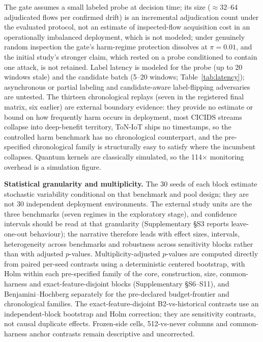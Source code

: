 \documentclass[a4paper,fleqn]{cas-sc}
\begin{document}
The gate assumes a small labeled probe at decision time; its size ($\approx$32--64 adjudicated flows per confirmed drift) is an incremental adjudication count under the evaluated protocol, not an estimate of inspected-flow acquisition cost in an operationally imbalanced deployment, which is not modeled; under genuinely random inspection the gate's harm-regime protection dissolves at $\pi = 0.01$, and the initial study's stronger claim, which rested on a probe conditioned to contain one attack, is not retained. Label latency is modeled for the probe (up to 20 windows stale) and the candidate batch (5--20 windows; Table~\ref{tab:latency}); asynchronous or partial labeling and candidate-aware label-flipping adversaries are untested. The thirteen chronological replays (seven in the registered final matrix, six earlier) are external boundary evidence: they provide no estimate or bound on how frequently harm occurs in deployment, most CICIDS streams collapse into deep-benefit territory, ToN-IoT ships no timestamps, so the controlled harm benchmark has no chronological counterpart, and the pre-specified chronological family is structurally easy to satisfy where the incumbent collapses. Quantum kernels are classically simulated, so the 114$\times$ monitoring overhead is a simulation figure.

\textbf{Statistical granularity and multiplicity.} The 30 seeds of each block estimate stochastic variability conditional on that benchmark and pool design; they are not 30 independent deployment environments. The external study units are the three benchmarks (seven regimes in the exploratory stage), and confidence intervals should be read at that granularity (Supplementary \S S3 reports leave-one-out behaviour); the narrative therefore leads with effect sizes, intervals, heterogeneity across benchmarks and robustness across sensitivity blocks rather than with adjusted $p$-values. Multiplicity-adjusted $p$-values are computed directly from paired per-seed contrasts using a deterministic centered bootstrap, with Holm \cite{holm1979simple} within each pre-specified family of the core, construction, size, common-harness and exact-feature-disjoint blocks (Supplementary \S S6--S11), and Benjamini--Hochberg \cite{benjamini1995controlling} separately for the pre-declared budget-frontier and chronological families. The exact-feature-disjoint B2-vs-historical contrasts use an independent-block bootstrap and Holm correction; they are sensitivity contrasts, not causal duplicate effects. Frozen-side cells, 512-vs-never columns and common-harness anchor contrasts remain descriptive and uncorrected.
\end{document}
